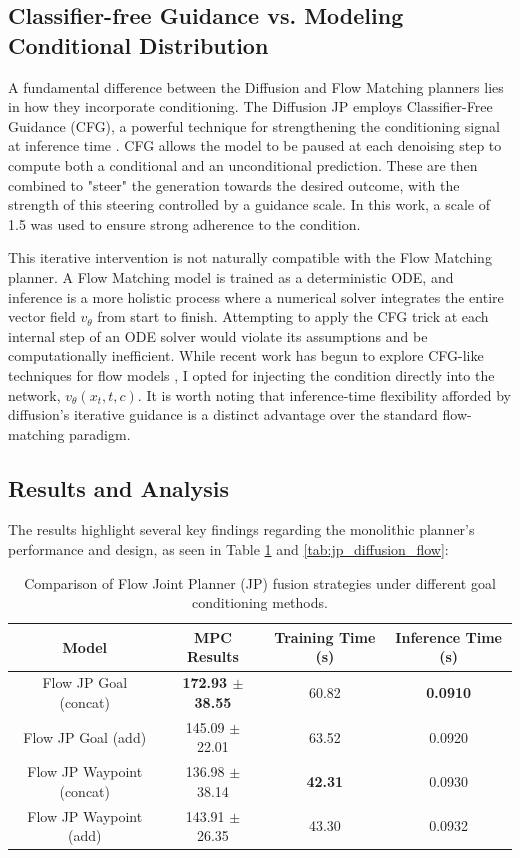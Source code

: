 \subsection{Classifier-free Guidance vs. Modeling Conditional Distribution}
A fundamental difference between the Diffusion and Flow Matching planners lies in how they incorporate conditioning. The Diffusion JP employs Classifier-Free Guidance (CFG), a powerful technique for strengthening the conditioning signal at inference time \cite{hoClassifierFreeDiffusionGuidance2022a}. CFG allows the model to be paused at each denoising step to compute both a conditional and an unconditional prediction. These are then combined to "steer" the generation towards the desired outcome, with the strength of this steering controlled by a guidance scale. In this work, a scale of 1.5 was used to ensure strong adherence to the condition.

This iterative intervention is not naturally compatible with the Flow Matching planner. A Flow Matching model is trained as a deterministic ODE, and inference is a more holistic process where a numerical solver integrates the entire vector field $v_\theta$ from start to finish. Attempting to apply the CFG trick at each internal step of an ODE solver would violate its assumptions and be computationally inefficient. While recent work has begun to explore CFG-like techniques for flow models \cite{fanCFGZeroImprovedClassifierFree2025}, I opted for injecting the condition directly into the network, $v_\theta(x_t,t,c).$ It is worth noting that inference-time flexibility afforded by diffusion's iterative guidance is a distinct advantage over the standard flow-matching paradigm.


\subsection{Results and Analysis}
The results highlight several key findings regarding the monolithic planner's performance and design, as seen in Table \ref{tab:jp_fusion} and \ref{tab:jp_diffusion_flow}:
\begin{table}[H]
\centering
\caption{Comparison of Flow Joint Planner (JP) fusion strategies under different goal conditioning methods.}
\label{tab:jp_fusion}
\begin{tabular}{|c|c|c|c|}
\hline
\textbf{Model} & \textbf{MPC Results} & \textbf{Training Time (s)} & \textbf{Inference Time (s)} \\
\hline
Flow JP Goal (concat) & \textbf{172.93 $\pm$ 38.55} & 60.82 & \textbf{0.0910} \\
\hline
Flow JP Goal (add) & 145.09 $\pm$ 22.01 & 63.52 & 0.0920 \\
\hline
Flow JP Waypoint (concat) & 136.98 $\pm$ 38.14 & \textbf{42.31} & 0.0930 \\
\hline
Flow JP Waypoint (add) & 143.91 $\pm$ 26.35 & 43.30 & 0.0932 \\
\hline
\end{tabular}
\end{table}

